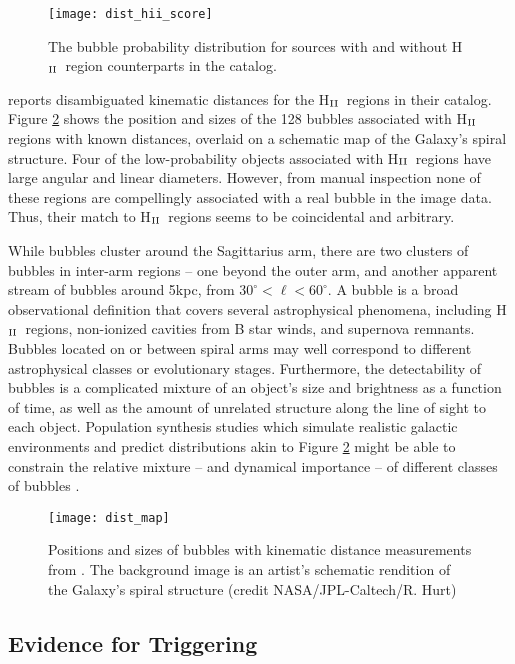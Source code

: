 \documentclass[preprint]{aastex}
\newcommand{\hii}[0]{H$_{\rm II}$}
\begin{document}
\begin{figure}[h!]
\texttt{[image: dist\_hii\_score]}
\caption{The bubble probability distribution for sources with and without \hii\, region counterparts in the \cite{Anderson11} catalog.}
\label{fig:hii_score}
\end{figure}

\cite{Anderson11} reports disambiguated kinematic distances for the \hii\, regions in their catalog. Figure \ref{fig:dist_map} shows the position and sizes of the 128 bubbles associated with \hii\, regions with known distances, overlaid on a schematic map of the Galaxy's spiral structure. Four of the low-probability objects associated with \hii\, regions have large angular and linear diameters. However, from manual inspection none of these regions are compellingly associated with a real bubble in the image data. Thus, their match to \hii\, regions seems to be coincidental and arbitrary.

While bubbles cluster around the Sagittarius arm, there are two clusters of bubbles in inter-arm regions -- one beyond the outer arm, and another apparent stream of bubbles around 5kpc, from $30^\circ < \ell < 60^\circ$. A bubble is a broad observational definition that covers several astrophysical phenomena, including \hii\, regions, non-ionized cavities from B star winds, and supernova remnants. Bubbles located on or between spiral arms may well correspond to different astrophysical classes or evolutionary stages. Furthermore, the detectability of bubbles is a complicated mixture of an object's size and brightness as a function of time, as well as the amount of unrelated structure along the line of sight to each object. Population synthesis studies which simulate realistic galactic environments and predict distributions akin to Figure \ref{fig:dist_map} might be able to constrain the relative mixture -- and dynamical importance -- of different classes of bubbles \citep{Robin03,Robitaille12}.

\begin{figure}[h!]
\texttt{[image: dist\_map]}
\caption{Positions and sizes of bubbles with kinematic distance measurements from \cite{Anderson11}. The background image is an artist's schematic rendition of the Galaxy's spiral structure (credit NASA/JPL-Caltech/R. Hurt)}
\label{fig:dist_map}
\end{figure}

\subsection{Evidence for Triggering}
\end{document}
